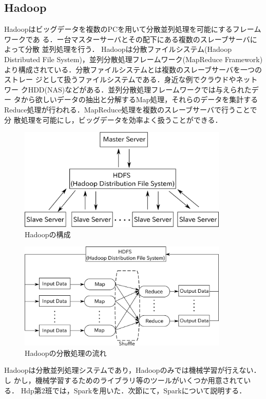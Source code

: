\documentclass[a4paper,12pt]{jarticle}
\begin{document}
\subsection{Hadoop}
Hadoopはビッグデータを複数のPCを用いて分散並列処理を可能にするフレームワークであ
る．ー台マスターサーバとその配下にある複数のスレーブサーバによって分散
並列処理を行う．
Hadoopは分散ファイルシステム(Hadoop Distributed File
System)，並列分散処理フレームワーク(MapReduce
Framework)より構成されている．分散ファイルシステムとは複数のスレーブサーバを一つのストレー
ジとして扱うファイルシステムである．身近な例でクラウドやネットワー
クHDD(NAS)などがある．並列分散処理フレームワークでは与えられたデー
タから欲しいデータの抽出と分解するMap処理，それらのデータを集計する
Reduce処理が行われる．MapReduce処理を複数のスレーブサーバで行うことで分
散処理を可能にし，ビッグデータを効率よく扱うことができる．
%
\begin{figure}[htbp]
 \begin{center}
  \includegraphics[width=100mm]{fig/Hadoop.eps}
  \caption{Hadoopの構成}
  \label{fig:hadoop}
 \end{center}
\end{figure}
%
%
\begin{figure}[htbp]
 \begin{center}
  \includegraphics[width=100mm]{fig/MapReduce.eps}
  \caption{Hadoopの分散処理の流れ}
  \label{fig:MapReduce}
 \end{center}
\end{figure}
%
Hadoopは分散並列処理システムであり，Hadoopのみでは機械学習が行えない．し
かし，機械学習するためのライブラリ等のツールがいくつか用意されている．
Hdp第2班では，Sparkを用いた．次節にて，Sparkについて説明する．
\end{document}

